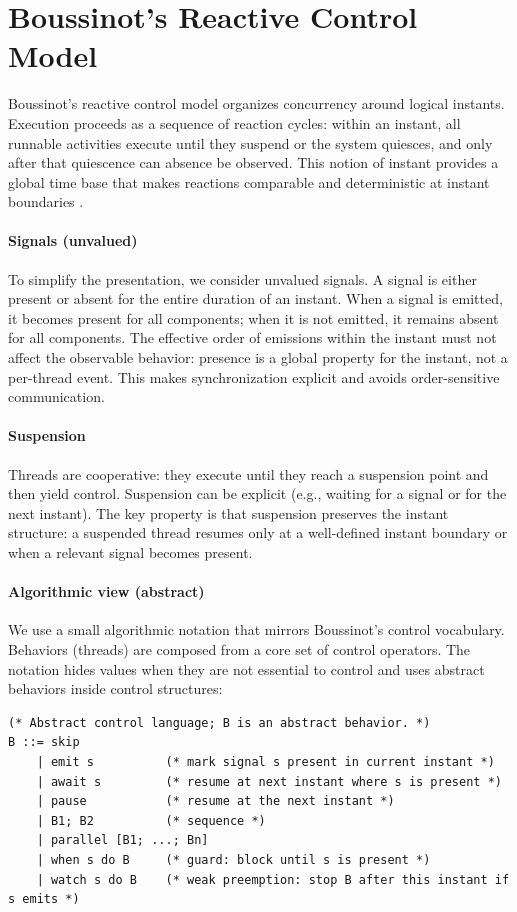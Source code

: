\section{Boussinot's Reactive Control Model}
\label{sec:boussinot-control}
Boussinot's reactive control model organizes concurrency around logical
instants. Execution proceeds as a sequence of reaction cycles: within an
instant, all runnable activities execute until they suspend or the system
quiesces, and only after that quiescence can absence be observed. This notion
of instant provides a global time base that makes reactions comparable and
deterministic at instant boundaries \cite{fairthreads2003}.

\paragraph{Signals (unvalued)}
To simplify the presentation, we consider unvalued signals. A signal is either
present or absent for the entire duration of an instant. When a signal is
emitted, it becomes present for all components; when it is not emitted, it
remains absent for all components. The effective order of emissions within the
instant must not affect the observable behavior: presence is a global property
for the instant, not a per-thread event. This makes synchronization explicit
and avoids order-sensitive communication.

\paragraph{Suspension}
Threads are cooperative: they execute until they reach a suspension point and
then yield control. Suspension can be explicit (e.g., waiting for a signal or
for the next instant). The key property is that suspension preserves the
instant structure: a suspended thread resumes only at a well-defined instant
boundary or when a relevant signal becomes present.

\paragraph{Algorithmic view (abstract)}
We use a small algorithmic notation that mirrors Boussinot's control vocabulary.
Behaviors (threads) are composed from a core set of control operators. The
notation hides values when they are not essential to control and uses abstract
behaviors inside control structures:
\begin{lstlisting}[style=tempo]
(* Abstract control language; B is an abstract behavior. *)
B ::= skip
    | emit s          (* mark signal s present in current instant *)
    | await s         (* resume at next instant where s is present *)
    | pause           (* resume at the next instant *)
    | B1; B2          (* sequence *)
    | parallel [B1; ...; Bn]
    | when s do B     (* guard: block until s is present *)
    | watch s do B    (* weak preemption: stop B after this instant if s emits *)
\end{lstlisting}

